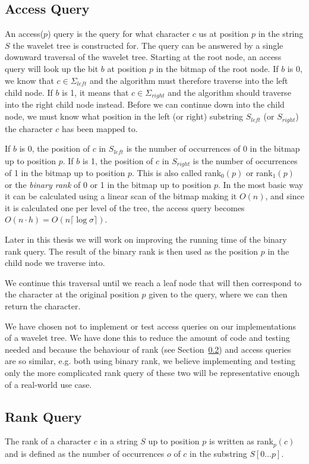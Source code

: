 \subsection{Access Query}
An access($p$) query is the query for what character $c$ us at position $p$ in the string $S$ the wavelet tree is constructed for.
The query can be answered by a single downward traversal of the wavelet tree.
Starting at the root node, an access query will look up the bit $b$ at position $p$ in the bitmap of the root node.
If $b$ is 0, we know that $c \in \Sigma_{\mathit{left}}$ and the algorithm must therefore traverse into the left child node.
If $b$ is 1, it means that $c \in \Sigma_{\mathit{right}}$ and the algorithm should traverse into the right child node instead.
Before we can continue down into the child node, we must know what position in the left (or right) substring $S_{\mathit{left}}$ (or $S_{\mathit{right}}$) the character $c$ has been mapped to.

If $b$ is 0, the position of $c$ in $S_{\mathit{left}}$ is the number of occurrences of 0 in the bitmap up to position $p$.
If $b$ is 1, the position of $c$ in $S_{\mathit{right}}$ is the number of occurrences of 1 in the bitmap up to position $p$.
This is also called rank$_0(p)$ or rank$_1(p)$ or the \textit{binary rank} of 0 or 1 in the bitmap up to position $p$.
In the most basic way it can be calculated using a linear scan of the bitmap making it $O(n)$, and since it is calculated one per level of the tree, the access query becomes $O(n \cdot h) = O(n \lceil \log \sigma \rceil)$.

Later in this thesis we will work on improving the running time of the binary rank query.
The result of the binary rank is then used as the position $p$ in the child node we traverse into.

We continue this traversal until we reach a leaf node that will then correspond to the character at the original position $p$ given to the query, where we can then return the character.

We have chosen not to implement or test access queries on our implementations of a wavelet tree.
We have done this to reduce the amount of code and testing needed and because the behaviour of rank (see Section~\ref{sec:rankDescription}) and access queries are so similar, e.g. both using binary rank, we believe implementing and testing only the more complicated rank query of these two will be representative enough of a real-world use case.

\subsection{Rank Query}
\label{sec:rankDescription}
The rank of a character $c$ in a string $S$ up to position $p$ is written as rank$_{p}(c)$ and is defined as the number of occurrences $o$ of $c$ in the substring $S[0 \ldots p]$.

